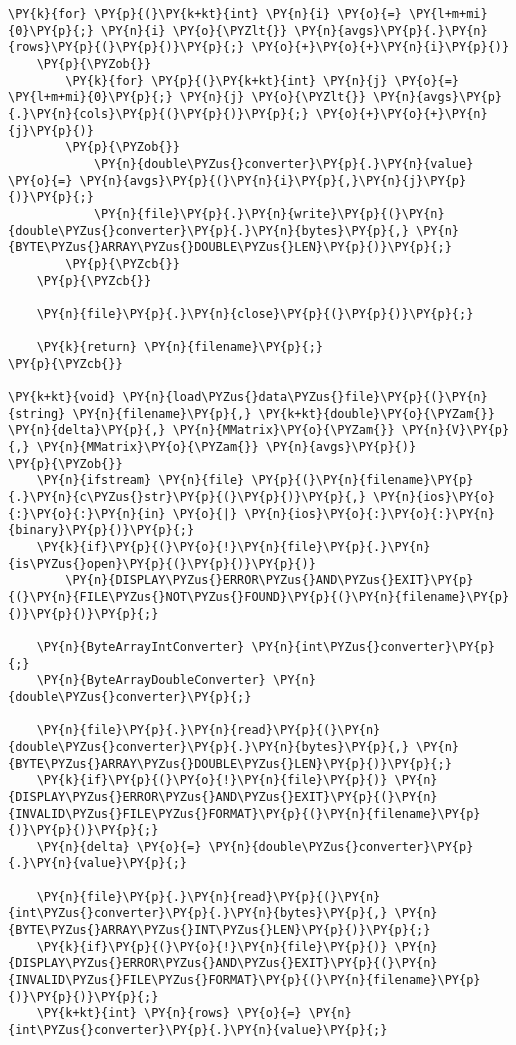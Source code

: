 \begin{Verbatim}[commandchars=\\\{\}]
    \PY{k}{for} \PY{p}{(}\PY{k+kt}{int} \PY{n}{i} \PY{o}{=} \PY{l+m+mi}{0}\PY{p}{;} \PY{n}{i} \PY{o}{\PYZlt{}} \PY{n}{avgs}\PY{p}{.}\PY{n}{rows}\PY{p}{(}\PY{p}{)}\PY{p}{;} \PY{o}{+}\PY{o}{+}\PY{n}{i}\PY{p}{)}
    \PY{p}{\PYZob{}}
    	\PY{k}{for} \PY{p}{(}\PY{k+kt}{int} \PY{n}{j} \PY{o}{=} \PY{l+m+mi}{0}\PY{p}{;} \PY{n}{j} \PY{o}{\PYZlt{}} \PY{n}{avgs}\PY{p}{.}\PY{n}{cols}\PY{p}{(}\PY{p}{)}\PY{p}{;} \PY{o}{+}\PY{o}{+}\PY{n}{j}\PY{p}{)}
    	\PY{p}{\PYZob{}}
    		\PY{n}{double\PYZus{}converter}\PY{p}{.}\PY{n}{value} \PY{o}{=} \PY{n}{avgs}\PY{p}{(}\PY{n}{i}\PY{p}{,}\PY{n}{j}\PY{p}{)}\PY{p}{;}
    		\PY{n}{file}\PY{p}{.}\PY{n}{write}\PY{p}{(}\PY{n}{double\PYZus{}converter}\PY{p}{.}\PY{n}{bytes}\PY{p}{,} \PY{n}{BYTE\PYZus{}ARRAY\PYZus{}DOUBLE\PYZus{}LEN}\PY{p}{)}\PY{p}{;}
    	\PY{p}{\PYZcb{}}
    \PY{p}{\PYZcb{}}

	\PY{n}{file}\PY{p}{.}\PY{n}{close}\PY{p}{(}\PY{p}{)}\PY{p}{;}

    \PY{k}{return} \PY{n}{filename}\PY{p}{;}
\PY{p}{\PYZcb{}}

\PY{k+kt}{void} \PY{n}{load\PYZus{}data\PYZus{}file}\PY{p}{(}\PY{n}{string} \PY{n}{filename}\PY{p}{,} \PY{k+kt}{double}\PY{o}{\PYZam{}} \PY{n}{delta}\PY{p}{,} \PY{n}{MMatrix}\PY{o}{\PYZam{}} \PY{n}{V}\PY{p}{,} \PY{n}{MMatrix}\PY{o}{\PYZam{}} \PY{n}{avgs}\PY{p}{)}
\PY{p}{\PYZob{}}
	\PY{n}{ifstream} \PY{n}{file} \PY{p}{(}\PY{n}{filename}\PY{p}{.}\PY{n}{c\PYZus{}str}\PY{p}{(}\PY{p}{)}\PY{p}{,} \PY{n}{ios}\PY{o}{:}\PY{o}{:}\PY{n}{in} \PY{o}{|} \PY{n}{ios}\PY{o}{:}\PY{o}{:}\PY{n}{binary}\PY{p}{)}\PY{p}{;}
	\PY{k}{if}\PY{p}{(}\PY{o}{!}\PY{n}{file}\PY{p}{.}\PY{n}{is\PYZus{}open}\PY{p}{(}\PY{p}{)}\PY{p}{)}
		\PY{n}{DISPLAY\PYZus{}ERROR\PYZus{}AND\PYZus{}EXIT}\PY{p}{(}\PY{n}{FILE\PYZus{}NOT\PYZus{}FOUND}\PY{p}{(}\PY{n}{filename}\PY{p}{)}\PY{p}{)}\PY{p}{;}

	\PY{n}{ByteArrayIntConverter} \PY{n}{int\PYZus{}converter}\PY{p}{;}
	\PY{n}{ByteArrayDoubleConverter} \PY{n}{double\PYZus{}converter}\PY{p}{;}

    \PY{n}{file}\PY{p}{.}\PY{n}{read}\PY{p}{(}\PY{n}{double\PYZus{}converter}\PY{p}{.}\PY{n}{bytes}\PY{p}{,} \PY{n}{BYTE\PYZus{}ARRAY\PYZus{}DOUBLE\PYZus{}LEN}\PY{p}{)}\PY{p}{;}
    \PY{k}{if}\PY{p}{(}\PY{o}{!}\PY{n}{file}\PY{p}{)} \PY{n}{DISPLAY\PYZus{}ERROR\PYZus{}AND\PYZus{}EXIT}\PY{p}{(}\PY{n}{INVALID\PYZus{}FILE\PYZus{}FORMAT}\PY{p}{(}\PY{n}{filename}\PY{p}{)}\PY{p}{)}\PY{p}{;}
    \PY{n}{delta} \PY{o}{=} \PY{n}{double\PYZus{}converter}\PY{p}{.}\PY{n}{value}\PY{p}{;}

    \PY{n}{file}\PY{p}{.}\PY{n}{read}\PY{p}{(}\PY{n}{int\PYZus{}converter}\PY{p}{.}\PY{n}{bytes}\PY{p}{,} \PY{n}{BYTE\PYZus{}ARRAY\PYZus{}INT\PYZus{}LEN}\PY{p}{)}\PY{p}{;}
    \PY{k}{if}\PY{p}{(}\PY{o}{!}\PY{n}{file}\PY{p}{)} \PY{n}{DISPLAY\PYZus{}ERROR\PYZus{}AND\PYZus{}EXIT}\PY{p}{(}\PY{n}{INVALID\PYZus{}FILE\PYZus{}FORMAT}\PY{p}{(}\PY{n}{filename}\PY{p}{)}\PY{p}{)}\PY{p}{;}
    \PY{k+kt}{int} \PY{n}{rows} \PY{o}{=} \PY{n}{int\PYZus{}converter}\PY{p}{.}\PY{n}{value}\PY{p}{;}


\end{Verbatim}
